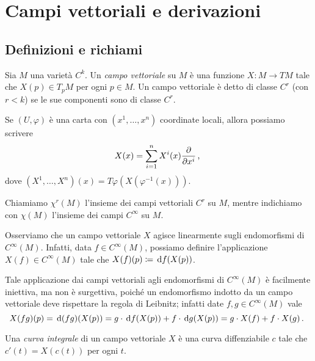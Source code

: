 \chapter{Campi vettoriali e derivazioni}

\section{Definizioni e richiami} %

\begin{definition} 
	Sia $M$ una varietà $C^k$. Un \emph{campo vettoriale} su $M$ è una funzione $X:M\to TM$ tale che $X(p)\in T_pM$ per ogni $p\in M$. Un campo vettoriale è detto di classe $C^r$ (con $r< k$) se le sue componenti sono di classe $C^r$.
\end{definition}

Se $(U,\varphi)$ è una carta con $(x^1,\dots,x^n)$ coordinate locali, allora possiamo scrivere
\begin{equation*}
	X(x)=\sum_{i=1}^nX^i(x)\frac{\partial}{\partial x^i}\, \text{, }
\end{equation*}
dove $(X^1,\dots,X^n)(x)=T\varphi(X(\varphi^{-1}(x)))$.

 
Chiamiamo $\chi^r(M)$ l'insieme dei campi vettoriali $C^r$ su $M$, mentre indichiamo con $\chi(M)$ l'insieme dei campi $C^\infty$ su $M$.
 

\begin{remark} \label{nota:CampiVettEndomorfismiCinfinito}
	Osserviamo che un campo vettoriale $X$ agisce linearmente sugli endomorfismi di $C^\infty(M)$. Infatti, data $f\in C^\infty(M)$, possiamo definire l'applicazione $X(f)\in C^\infty(M)$ tale che $X(f)(p)\coloneqq \,\mathrm d f(X(p))$.
	
	Tale applicazione dai campi vettoriali agli endomorfismi di $C^\infty(M)$ è facilmente iniettiva, ma non è surgettiva, poiché un endomorfismo indotto da un campo vettoriale deve rispettare la regola di Leibnitz; infatti date $f,g \in C^\infty(M)$ vale
	\begin{equation*}
		X(fg) (p) = \,\mathrm d (f g) (X(p)) = g \cdot \,\mathrm d f (X(p)) + f \cdot \,\mathrm d g(X(p)) = g \cdot X(f) + f \cdot X(g) \, \text{. } 
	\end{equation*}

\end{remark}

 
\begin{definition} 
	Una \emph{curva integrale} di un campo vettoriale $X$ è una curva diffenziabile $c$ tale che $c'(t)=X(c(t))$ per ogni $t$.
\end{definition}

